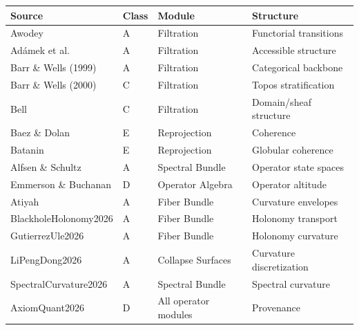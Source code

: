 \begin{center}
\begin{tabular}{llll}
\textbf{Source} & \textbf{Class} & \textbf{Module} & \textbf{Structure} \\
\hline
Awodey & A & Filtration & Functorial transitions \\
Adámek et al. & A & Filtration & Accessible structure \\
Barr \& Wells (1999) & A & Filtration & Categorical backbone \\
Barr \& Wells (2000) & C & Filtration & Topos stratification \\
Bell & C & Filtration & Domain/sheaf structure \\
Baez \& Dolan & E & Reprojection & Coherence \\
Batanin & E & Reprojection & Globular coherence \\
Alfsen \& Schultz & A & Spectral Bundle & Operator state spaces \\
Emmerson \& Buchanan & D & Operator Algebra & Operator altitude \\
Atiyah & A & Fiber Bundle & Curvature envelopes \\
BlackholeHolonomy2026 & A & Fiber Bundle & Holonomy transport \\
GutierrezUle2026 & A & Fiber Bundle & Holonomy curvature \\
LiPengDong2026 & A & Collapse Surfaces & Curvature discretization \\
SpectralCurvature2026 & A & Spectral Bundle & Spectral curvature \\
AxiomQuant2026 & D & All operator modules & Provenance \\
\end{tabular}
\end{center}

